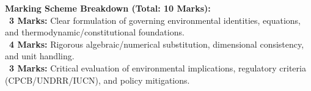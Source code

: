 \begin{examinertip}
\textbf{Marking Scheme Breakdown (Total: 10 Marks):}\\
\textbullet\ \textbf{3 Marks:} Clear formulation of governing environmental identities, equations, and thermodynamic/constitutional foundations.\\
\textbullet\ \textbf{4 Marks:} Rigorous algebraic/numerical substitution, dimensional consistency, and unit handling.\\
\textbullet\ \textbf{3 Marks:} Critical evaluation of environmental implications, regulatory criteria (CPCB/UNDRR/IUCN), and policy mitigations.
\end{examinertip}
